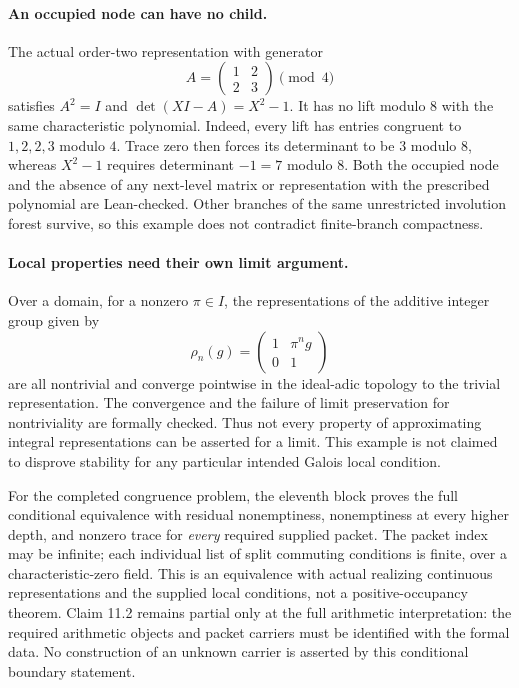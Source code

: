 \documentclass[11pt]{article}
\theoremstyle{definition}
\theoremstyle{remark}
\begin{document}
\paragraph{An occupied node can have no child.}
The actual order-two representation with generator
\[
 A=\begin{pmatrix}1&2\\2&3\end{pmatrix}\pmod4
\]
satisfies $A^2=I$ and $\det(XI-A)=X^2-1$. It has no lift modulo $8$ with
the same characteristic polynomial. Indeed, every lift has entries congruent
to $1,2,2,3$ modulo $4$. Trace zero then forces its determinant to be $3$
modulo $8$, whereas $X^2-1$ requires determinant $-1=7$ modulo $8$.
Both the occupied node and the absence of any next-level matrix or representation
with the prescribed polynomial are Lean-checked. Other branches of the same
unrestricted involution forest survive, so this example does not contradict
finite-branch compactness.

\paragraph{Local properties need their own limit argument.}
Over a domain, for a nonzero $\pi\in I$, the representations of the additive
integer group given by
\[
 \rho_n(g)=\begin{pmatrix}1&\pi^n g\\0&1\end{pmatrix}
\]
are all nontrivial and converge pointwise in the ideal-adic topology to the
trivial representation. The convergence and the failure of limit preservation
for nontriviality are formally checked. Thus not every property of approximating
integral representations can be asserted for a limit. This example is not
claimed to disprove stability for any particular intended Galois local condition.

For the completed congruence problem, the eleventh block proves the full
conditional equivalence with residual nonemptiness, nonemptiness at every higher
depth, and nonzero trace for \emph{every} required supplied packet. The packet
index may be infinite; each individual list of split commuting conditions is
finite, over a characteristic-zero field. This is an equivalence with actual
realizing continuous representations and the supplied local conditions, not a
positive-occupancy theorem. Claim 11.2 remains partial only at the full arithmetic
interpretation: the required arithmetic objects and packet carriers must be
identified with the formal data. No construction of an unknown carrier is
asserted by this conditional boundary statement.
\end{document}
